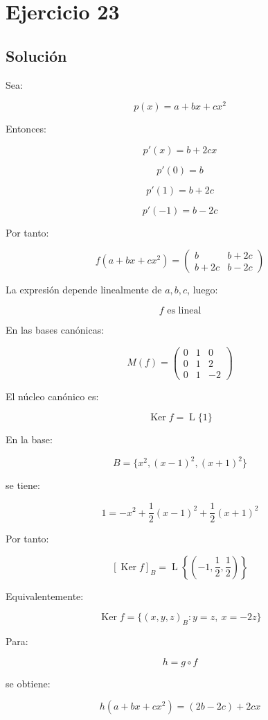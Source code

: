 \documentclass[11pt,a4paper]{article}
\newcommand{\Ker}{\operatorname{Ker}}
\newcommand{\Span}{\operatorname{L}}
\begin{document}
\section{Ejercicio 23}
	\subsection{Solución}

	Sea:

	\[
	p(x)=a+bx+cx^2
	\]

	Entonces:

	\[
	p'(x)=b+2cx
	\]

	\[
	p'(0)=b
	\]

	\[
	p'(1)=b+2c
	\]

	\[
	p'(-1)=b-2c
	\]

	Por tanto:

	\[
	f(a+bx+cx^2)
	=
	\begin{pmatrix}
	b&b+2c\\
	b+2c&b-2c
	\end{pmatrix}
	\]

	La expresión depende linealmente de $a,b,c$, luego:

	\[
	\boxed{
	f\text{ es lineal}
	}
	\]

	En las bases canónicas:

	\[
	\boxed{
	M(f)
	=
	\begin{pmatrix}
	0&1&0\\
	0&1&2\\
	0&1&-2
	\end{pmatrix}
	}
	\]

	El núcleo canónico es:

	\[
	\Ker f
	=
	\Span\{1\}
	\]

	En la base:

	\[
	B=\{x^2,(x-1)^2,(x+1)^2\}
	\]

	se tiene:

	\[
	1
	=
	-x^2
	+
	\frac12(x-1)^2
	+
	\frac12(x+1)^2
	\]

	Por tanto:

	\[
	[\Ker f]_B
	=
	\Span\left\{
	\left(-1,\frac12,\frac12\right)
	\right\}
	\]

	Equivalentemente:

	\[
	\boxed{
	\Ker f
	=
	\{(x,y,z)_B:y=z,\ x=-2z\}
	}
	\]

	Para:

	\[
	h=g\circ f
	\]

	se obtiene:

	\[
	h(a+bx+cx^2)
	=
	(2b-2c)+2cx
	\]
\end{document}
